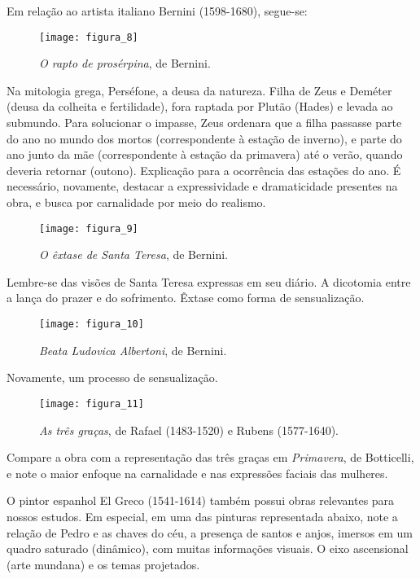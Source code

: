 \documentclass[12pt]{book}
\begin{document}
			\par Em relação ao artista italiano Bernini (1598-1680), segue-se:
			\begin{figure}[h]
				\centering
				\texttt{[image: figura\_8]}
				\caption{\textit{O rapto de prosérpina}, de Bernini.}
				\label{fig:mesh8}
			\end{figure}
			\par Na mitologia grega, Perséfone, a deusa da natureza. Filha de Zeus e Deméter (deusa da colheita e fertilidade), fora raptada por Plutão (Hades) e levada ao submundo. Para solucionar o impasse, Zeus ordenara que a filha passasse parte do ano no mundo dos mortos (correspondente à estação de inverno), e parte do ano junto da mãe (correspondente à estação da primavera) até o verão, quando deveria retornar (outono). Explicação para a ocorrência das estações do ano. É necessário, novamente, destacar a expressividade e dramaticidade presentes na obra, e busca por carnalidade por meio do realismo.
			\begin{figure}[h]
				\centering
				\texttt{[image: figura\_9]}
				\caption{\textit{O êxtase de Santa Teresa}, de Bernini.}
				\label{fig:mesh9}
			\end{figure}
			\par Lembre-se das visões de Santa Teresa expressas em seu diário. A dicotomia entre a lança do prazer e do sofrimento. Êxtase como forma de sensualização.
			\begin{figure}[h]
				\centering
				\texttt{[image: figura\_10]}
				\caption{\textit{Beata Ludovica Albertoni}, de Bernini.}
				\label{fig:mesh10}
			\end{figure}
			\par Novamente, um processo de sensualização.
			\begin{figure}[h]
				\centering
				\texttt{[image: figura\_11]}
				\caption{\textit{As três graças}, de Rafael (1483-1520) e Rubens (1577-1640).}
				\label{fig:mesh11}
			\end{figure}
			\par Compare a obra com a representação das três graças em \textit{Primavera}, de Botticelli, e note o maior enfoque na carnalidade e nas expressões faciais das mulheres.
			\par O pintor espanhol El Greco (1541-1614) também possui obras relevantes para nossos estudos. Em especial, em uma das pinturas representada abaixo, note a relação de Pedro e as chaves do céu, a presença de santos e anjos, imersos em um quadro saturado (dinâmico), com muitas informações visuais. O eixo ascensional (arte mundana) e os temas projetados.
\end{document}
